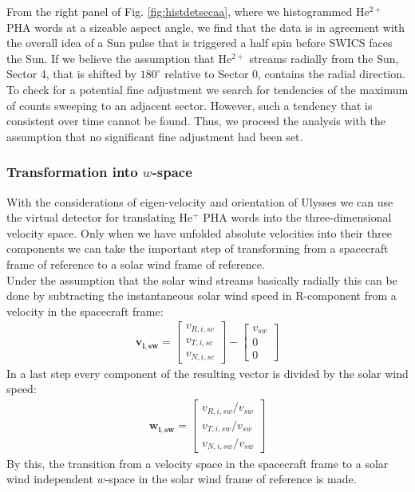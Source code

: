 From the right panel of Fig. \ref{fig:histdetsecaa}, where we histogrammed $\mathrm{He^{2+}}$ PHA words at a sizeable aspect angle, we find that the data is in agreement with the overall idea of a Sun pulse that is triggered a half spin before SWICS faces the Sun. If we believe the assumption that $\mathrm{He^{2+}}$ streams radially from the Sun, Sector 4, that is shifted by $180^\circ$ relative to Sector 0, contains the radial direction.\\ 
To check for a potential fine adjustment we search for tendencies of the maximum of counts sweeping to an adjacent sector. However, such a tendency that is consistent over time cannot be found. Thus, we proceed the analysis with the assumption that no significant fine adjustment had been set. 
\subsubsection{Transformation into $w$-space}
With the considerations of eigen-velocity and orientation of Ulysses we can use the virtual detector for translating $\mathrm{He^{+}}$ PHA words into the three-dimensional velocity space. Only when we have unfolded absolute velocities into their three components we can take the important step of transforming from a spacecraft frame of reference to a solar wind frame of reference. \\
Under the assumption that the solar wind streams basically radially this can be done by subtracting the instantaneous solar wind speed in R-component from a velocity in the spacecraft frame: 
\begin{align*}
\mathbf{v_{i,sw}} = \begin{bmatrix}v_{R,i,sc}\\v_{T,i,sc}\\v_{N,i,sc}\end{bmatrix} - \begin{bmatrix}v_{sw}\\0\\0\end{bmatrix}
\end{align*}
In a last step every component of the resulting vector is divided by the solar wind speed:
\begin{align*}
\mathbf{w_{i,sw}} = \begin{bmatrix}v_{R,i,sw} / v_{sw}\\v_{T,i,sw} / v_{sw}\\v_{N,i,sw} / v_{sw}\end{bmatrix}
\end{align*}
By this, the transition from a velocity space in the spacecraft frame to a solar wind independent $w$-space in the solar wind frame of reference is made.
%
%
%
%
